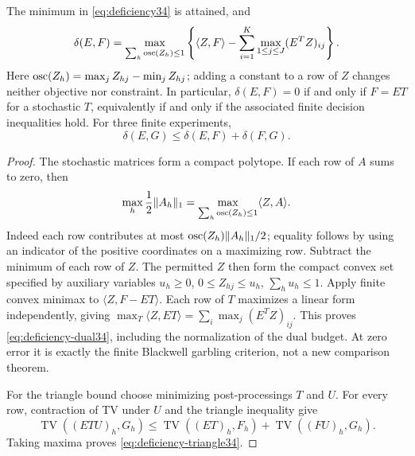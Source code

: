 \begin{proposition}\label{prop:blackwell34}
The minimum in \eqref{eq:deficiency34} is attained, and
\begin{equation}\label{eq:deficiency-dual34}
 \delta(E,F)=\max_{\sum_h\operatorname{osc}(Z_h)\le1}
 \left\{\langle Z,F\rangle-\sum_{i=1}^K\max_{1\le j\le J}
                                      (E^TZ)_{ij}\right\}.
\end{equation}
Here $\operatorname{osc}(Z_h)=\max_jZ_{hj}-\min_jZ_{hj}$; adding a constant to a row
of $Z$ changes neither objective nor constraint. In particular,
$\delta(E,F)=0$ if and only if $F=ET$ for a stochastic $T$, equivalently
if and only if the associated finite decision inequalities hold.
For three finite experiments,
\begin{equation}\label{eq:deficiency-triangle34}
                   \delta(E,G)\le\delta(E,F)+\delta(F,G).
\end{equation}
\end{proposition}
\begin{proof}
The stochastic matrices form a compact polytope. If each row of $A$ sums
to zero, then
\[
 \max_h\frac12\|A_h\|_1
       =\max_{\sum_h\operatorname{osc}(Z_h)\le1}\langle Z,A\rangle.
\]
Indeed each row contributes at most $\operatorname{osc}(Z_h)\|A_h\|_1/2$;
equality follows by using an indicator of the positive coordinates on a
maximizing row. Subtract the minimum of each row of $Z$. The permitted
$Z$ then form the compact convex set specified by auxiliary variables
$u_h\ge0$, $0\le Z_{hj}\le u_h$, $\sum_hu_h\le1$.
Apply finite convex minimax to $\langle Z,F-ET\rangle$. Each row of $T$
maximizes a linear form independently, giving
$\max_T\langle Z,ET\rangle=\sum_i\max_j(E^TZ)_{ij}$. This proves
\eqref{eq:deficiency-dual34}, including the normalization of the dual
budget. At zero error it is exactly the finite Blackwell garbling
criterion, not a new comparison theorem.

For the triangle bound choose minimizing post-processings $T$ and $U$.
For every row, contraction of TV under $U$ and the triangle inequality give
\[
 \operatorname{TV}((ETU)_h,G_h)
 \le\operatorname{TV}((ET)_h,F_h)+\operatorname{TV}((FU)_h,G_h).
\]
Taking maxima proves \eqref{eq:deficiency-triangle34}.
\end{proof}

